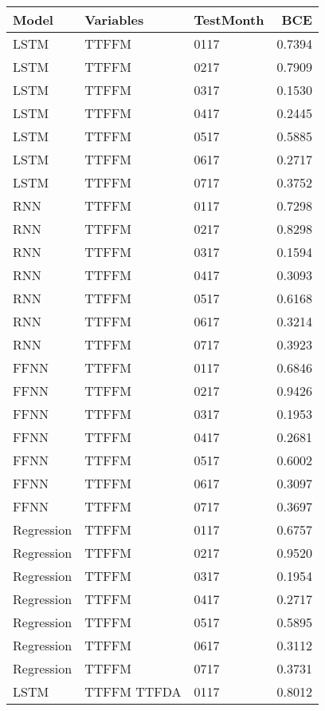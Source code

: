 \begin{table}[h!]
\centering
 \begin{adjustbox}{max width=\textwidth}
\begin{tabular}{lllr}
  \hline
Model & Variables & TestMonth & BCE \\ 
  \hline
LSTM & TTFFM  & 0117 & 0.7394 \\ 
  LSTM & TTFFM  & 0217 & 0.7909 \\ 
  LSTM & TTFFM  & 0317 & 0.1530 \\ 
  LSTM & TTFFM  & 0417 & 0.2445 \\ 
  LSTM & TTFFM  & 0517 & 0.5885 \\ 
  LSTM & TTFFM  & 0617 & 0.2717 \\ 
  LSTM & TTFFM  & 0717 & 0.3752 \\ 
  RNN & TTFFM  & 0117 & 0.7298 \\ 
  RNN & TTFFM  & 0217 & 0.8298 \\ 
  RNN & TTFFM  & 0317 & 0.1594 \\ 
  RNN & TTFFM  & 0417 & 0.3093 \\ 
  RNN & TTFFM  & 0517 & 0.6168 \\ 
  RNN & TTFFM  & 0617 & 0.3214 \\ 
  RNN & TTFFM  & 0717 & 0.3923 \\ 
  FFNN & TTFFM  & 0117 & 0.6846 \\ 
  FFNN & TTFFM  & 0217 & 0.9426 \\ 
  FFNN & TTFFM  & 0317 & 0.1953 \\ 
  FFNN & TTFFM  & 0417 & 0.2681 \\ 
  FFNN & TTFFM  & 0517 & 0.6002 \\ 
  FFNN & TTFFM  & 0617 & 0.3097 \\ 
  FFNN & TTFFM  & 0717 & 0.3697 \\ 
  Regression & TTFFM  & 0117 & 0.6757 \\ 
  Regression & TTFFM  & 0217 & 0.9520 \\ 
  Regression & TTFFM  & 0317 & 0.1954 \\ 
  Regression & TTFFM  & 0417 & 0.2717 \\ 
  Regression & TTFFM  & 0517 & 0.5895 \\ 
  Regression & TTFFM  & 0617 & 0.3112 \\ 
  Regression & TTFFM  & 0717 & 0.3731 \\ 
  LSTM & TTFFM TTFDA & 0117 & 0.8012 \\ 

\end{tabular}
\end{adjustbox}
\end{table}
